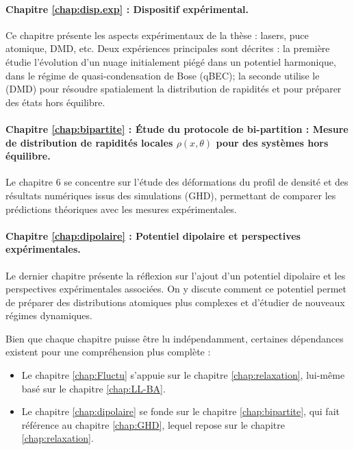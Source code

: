 \paragraph*{Chapitre \ref{chap:disp.exp} : Dispositif expérimental.}  
Ce chapitre présente les aspects expérimentaux de la thèse : lasers, puce atomique, \gls{DMD}, etc. Deux expériences principales sont décrites : la première étudie l’évolution d’un nuage initialement piégé dans un potentiel harmonique, dans le régime de quasi-condensation de Bose (\acrshort{qBEC}); la seconde utilise le (\acrshort{DMD}) pour résoudre spatialement la distribution de rapidités et pour préparer des états hors équilibre.

\paragraph*{Chapitre \ref{chap:bipartite} : Étude du protocole de bi-partition : Mesure de distribution de rapidités locales $\rho(x , \theta ) $  pour des systèmes hors équilibre.}
Le chapitre 6 se concentre sur l’étude des déformations du profil de densité et des résultats numériques issus des simulations (\acrshort{GHD}), permettant de comparer les prédictions théoriques avec les mesures expérimentales.

\paragraph*{Chapitre \ref{chap:dipolaire} : Potentiel dipolaire et perspectives expérimentales.}  
Le dernier chapitre présente la réflexion sur l’ajout d’un potentiel dipolaire et les perspectives expérimentales associées. On y discute comment ce potentiel permet de préparer des distributions atomiques plus complexes et d’étudier de nouveaux régimes dynamiques.

\bigskip

\noindent Bien que chaque chapitre puisse être lu indépendamment, certaines dépendances existent pour une compréhension plus complète :  
\begin{itemize}[label = $\bullet$]
    \item Le chapitre \ref{chap:Fluctu} s’appuie sur le chapitre \ref{chap:relaxation}, lui-même basé sur le chapitre \ref{chap:LL-BA}.  
    \item Le chapitre \ref{chap:dipolaire} se fonde sur le chapitre \ref{chap:bipartite}, qui fait référence au chapitre \ref{chap:GHD}, lequel repose sur le chapitre \ref{chap:relaxation}.  
\end{itemize}


